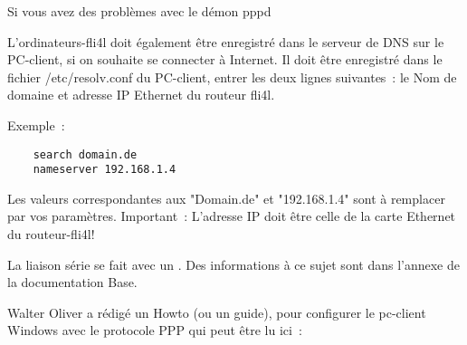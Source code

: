 \begin{description}
        Si vous avez des problèmes avec le démon pppd


        L'ordinateurs-fli4l doit également être enregistré dans le serveur de DNS
        sur le PC-client, si on souhaite se connecter à Internet. Il doit être
        enregistré dans le fichier /etc/resolv.conf du PC-client, entrer les deux
        lignes suivantes~: le Nom de domaine et adresse IP Ethernet du routeur fli4l.

        Exemple~:

\begin{example}
\begin{verbatim}
    search domain.de
    nameserver 192.168.1.4
\end{verbatim}
\end{example}

        Les valeurs correspondantes aux "Domain.de" et "192.168.1.4" sont à remplacer
        par vos paramètres. Important~: L'adresse IP doit être celle de la carte Ethernet
        du routeur-fli4l!


        La liaison série se fait avec un . Des
        informations à ce sujet sont dans l'annexe de la documentation Base.

        Walter Oliver a rédigé un Howto (ou un guide), pour configurer le pc-client
        Windows avec le protocole PPP qui peut être lu ici~:



\end{description}
